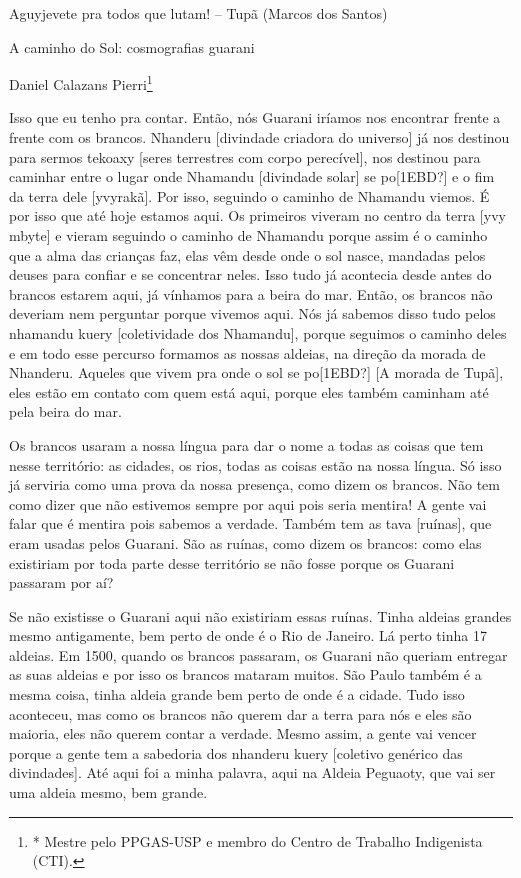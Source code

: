 \documentclass{article}
\begin{document}
Aguyjevete pra todos que lutam! -- Tup\~a (Marcos dos Santos)

A caminho do Sol: cosmografias guarani

Daniel Calazans Pierri\footnote{* Mestre pelo PPGAS-USP e membro do
Centro de Trabalho Indigenista (CTI).}

Isso que eu tenho pra contar. Ent\~ao, n\'os Guarani ir\'iamos nos
encontrar frente a frente com os brancos. Nhanderu [divindade criadora
do universo] j\'a nos destinou para sermos tekoaxy [seres terrestres
com corpo perec\'ivel], nos destinou para caminhar entre o lugar onde
Nhamandu [divindade solar] se po[1EBD?] e o fim da terra dele
[yvyrak\~a]. Por isso, seguindo o caminho de Nhamandu viemos. \'E por
isso que at\'e hoje estamos aqui. Os primeiros viveram no centro da
terra [yvy mbyte] e vieram seguindo o caminho de Nhamandu porque assim
\'e o caminho que a alma das crian\c{c}as faz, elas v\^em desde onde o
sol nasce, mandadas pelos deuses para confiar e se concentrar neles.
Isso tudo j\'a acontecia desde antes do brancos estarem aqui, j\'a
v\'inhamos para a beira do mar. Ent\~ao, os brancos n\~ao deveriam nem
perguntar porque vivemos aqui. N\'os j\'a sabemos disso tudo pelos
nhamandu kuery [coletividade dos Nhamandu], porque seguimos o caminho
deles e em todo esse percurso formamos as nossas aldeias, na
dire\c{c}\~ao da morada de Nhanderu. Aqueles que vivem pra onde o sol
se po[1EBD?] [A morada de Tup\~a], eles est\~ao em contato com quem
est\'a aqui, porque eles tamb\'em caminham at\'e pela beira do mar. 

Os brancos usaram a nossa l\'ingua para dar o nome a todas as coisas que
tem nesse territ\'orio: as cidades, os rios, todas as coisas est\~ao na
nossa l\'ingua. S\'o isso j\'a serviria como uma prova da nossa
presen\c{c}a, como dizem os brancos. N\~ao tem como dizer que n\~ao
estivemos sempre por aqui pois seria mentira! A gente vai falar que \'e
mentira pois sabemos a verdade. Tamb\'em tem as tava [ru\'inas], que
eram usadas pelos Guarani. S\~ao as ru\'inas, como dizem os brancos:
como elas existiriam por toda parte desse territ\'orio se n\~ao fosse
porque os Guarani passaram por a\'i? 

Se n\~ao existisse o Guarani aqui n\~ao existiriam essas ru\'inas. Tinha
aldeias grandes mesmo antigamente, bem perto de onde \'e o Rio de
Janeiro. L\'a perto tinha 17 aldeias. Em 1500, quando os brancos
passaram, os Guarani n\~ao queriam entregar as suas aldeias e por isso
os brancos mataram muitos. S\~ao Paulo tamb\'em \'e a mesma coisa,
tinha aldeia grande bem perto de onde \'e a cidade. Tudo isso
aconteceu, mas como os brancos n\~ao querem dar a terra para n\'os e
eles s\~ao maioria, eles n\~ao querem contar a verdade. Mesmo assim, a
gente vai vencer porque a gente tem a sabedoria dos nhanderu kuery
[coletivo gen\'erico das divindades]. At\'e aqui foi a minha palavra,
aqui na Aldeia Peguaoty, que vai ser uma aldeia mesmo, bem grande.
\end{document}
